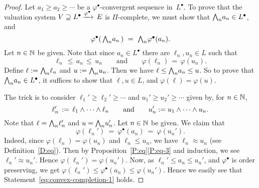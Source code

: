 \begin{proof}
Let $a_1 \geq a_2 \geq \dotsb$
be a $\varphi^\bullet$-convergent sequence in~$L^\bullet$.
To prove that the valuation system
$V \supseteq L^\bullet\,\smash{\xrightarrow{\varphi^\bullet}\,E}$ is $\Pi$-complete,
we must show that $\textstyle{\bigwedge}_n a_n \in L^\bullet$,
and
\begin{equation*}
\varphi^\bullet(\,\textstyle{\bigwedge}_n a_n\,) \ =\  \textstyle{\bigwedge}_n \varphi^\bullet(a_n).
\end{equation*}
Let $n\in \mathbb{N}$ be given.
Note that since $a_n \in L^\bullet$
there are $\ell_n,u_n \in L$
such that 
\begin{equation*}
\ell_n \,\leq\, a_n \,\leq\, u_n
\qquad\text{and}\qquad
\varphi(\ell_n) \,=\, \varphi(u_n).
\end{equation*}
Define $\ell:= \textstyle{\bigwedge}_n \ell_n$
and $u:= \textstyle{\bigwedge}_n u_n$.
Then we have $\ell \leq \textstyle{\bigwedge}_n a_n \leq u$.
So to prove that $\textstyle{\bigwedge}_n a_n \in L^\bullet$,
it suffices to show that $\ell,u\in L$,
and $\varphi(\ell)=\varphi(u)$.

The trick is
to consider
$\ell_1' \geq \ell_2 '\geq \dotsb$
and $u_1'\geq u_2' \geq\dotsb$
given by, for $n\in\mathbb{N}$,
\begin{equation*}
\ell_n' \,:=\, \ell_1 \wedge \dotsb \wedge \ell_n
\qquad\text{and}\qquad
u_n':= u_1 \wedge \dotsb \wedge u_n.
\end{equation*}
Note that
$\ell= \textstyle{\bigwedge}_n \ell_n '$ and $u= \textstyle{\bigwedge}_n u_n '$.
Let $n\in \mathbb{N}$ be given.
We claim that
\begin{equation}
\label{eq:convex-completion-1}
\varphi(\ell_n') \ =\  \varphi^\bullet(a_n)\ =\ \varphi(u_n').
\end{equation}
Indeed, since $\varphi(\ell_n) = \varphi(u_n)$
and $\ell_n\leq u_n$,
we have $\ell_n \approx u_n$
(see Definition~\ref{D:eq}).
Then 
by  Proposition~\ref{P:eq}\ref{P:eq-3}
and induction, we see $\ell_n' \approx u_n'$.
Hence  $\varphi(\ell_n') = \varphi(u_n')$.
Now, as
$\ell_n'\leq a_n \leq u_n'$,
and $\varphi^\bullet$ is order preserving,
we get
 $\varphi(\ell_n') \leq \varphi^\bullet(a_n) \leq \varphi(u_n')$.
Hence we easily see that Statement~\eqref{eq:convex-completion-1} holds.


\end{proof}
